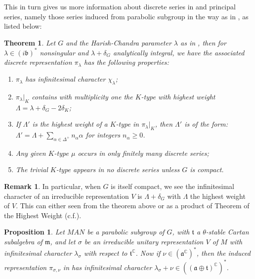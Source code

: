 \documentclass[11pt]{report}
\theoremstyle{definition}
\newtheorem{Rmk}{Remark}[chapter]
\theoremstyle{plain}
\newtheorem{Prop}[Def]{Proposition}
\newtheorem{Theo}[Def]{Theorem}
\newcommand{\complex}{\mathbb{C}}
\newcommand{\Lie}[1]{\mathfrak{#1}}
\begin{document}
This in turn gives us more information about discrete series in  and principal series, namely those series induced from parabolic subgroup in the way as in , as listed below:
\begin{Theo}\label{discrete series2}
	\textnormal{\cite[Theorem~9.20 \& Corollary 12.22]{knapp2016}} Let $G$ and the Harish-Chandra parameter $\lambda$ as in , then for $\lambda\in (i\Lie{b})^*$ nonsingular and $\lambda+\delta_G$ analytically integral, we have the associated discrete representation $\pi_\lambda$ has the following properties:
	\begin{enumerate}
		\item $\pi_\lambda$ has infinitesimal character $\chi_\lambda$;
		\item $\pi_\lambda|_K$ contains with multiplicity one the $K$-type with highest weight $\Lambda=\lambda+\delta_G-2\delta_K$;
		\item If $\Lambda'$ is the highest weight of a $K$-type in $\pi_\lambda|_K$, then $\Lambda'$ is of the form: $\Lambda'=\Lambda+\sum_{\alpha\in \Delta^+}n_\alpha\alpha$ for integers $n_\alpha\geq 0$.
		\item Any given $K$-type $\mu$ occurs in only finitely many discrete series;
		\item The trivial $K$-type appears in no discrete series unless $G$ is compact.
	\end{enumerate}
\end{Theo}
\begin{Rmk}\label{infichar of cpt grp}
	In particular, when $G$ is itself compact, we see the infinitesimal character of an irreducible representation $V$ is $\Lambda+\delta_G$ with $\Lambda$ the highest weight of $V$. This can either seen from the theorem above or as a product of Theorem of the Highest Weight (c.f.\cite[Theorem~5.5]{knapp2013}).
\end{Rmk}
\begin{Prop}\label{induced infi character}
	\textnormal{\cite[Proposition~8.22]{knapp2016}} Let $MAN$ be a parabolic subgroup of $G$, with $\Lie{t}$ a $\theta$-stable Cartan subalgebra of $\Lie{m}$, and let $\sigma$ be an irreducible unitary representation $V$ of $M$ with infinitesimal character $\lambda_{\sigma}$ with respect to $\Lie{t}^\complex$. Now if $\nu\in (\Lie{a}^\complex)^*$, then the induced representation $\pi_{\sigma, \nu}$ in  has infinitesimal character $\lambda_\sigma+\nu\in ((\Lie{a}\oplus \Lie{t})^\complex)^*$.
\end{Prop}
\end{document}
